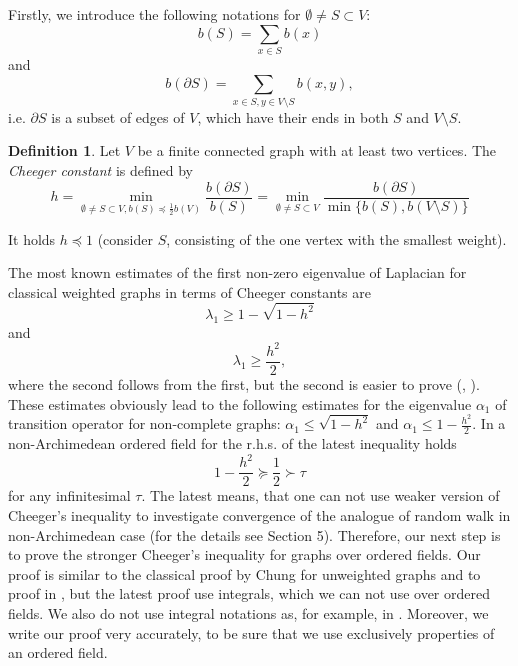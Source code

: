 \documentclass[a4paper,12pt]{amsart}
\theoremstyle{definition}
\newtheorem{definition}{Definition}
\newcommand{\weight}{b}
\begin{document}
Firstly, we introduce the following notations for $\emptyset\ne S\subset V$:
\begin{equation*}
\weight(S)=\sum_{x\in S}\weight (x)
\end{equation*}
and
\begin{equation*}
\weight(\partial S)=\sum_{x\in S,y\in V\setminus S}\weight (x,y),
\end{equation*}
i.e. $\partial S$ is a subset of edges of $V$, which have their ends in both $S$ and $V\setminus S$.
\begin{definition}
Let $V$ be a finite connected graph with at least two vertices. The \emph{Cheeger constant} is defined by
\begin{equation}\label{Def:Cheeger}
h = \min_{\emptyset\ne S\subset V, \weight(S)\preceq\frac{1}{2}\weight(V) }\dfrac{\weight(\partial S)}{\weight(S)}= \min_{\emptyset\ne S\subset V}\dfrac{\weight(\partial S)}{\min\{\weight(S),\weight(V\setminus S)\}}
\end{equation}
\end{definition}
It holds $h\preceq 1$ (consider $S$, consisting of the one vertex with the smallest weight).

The most known estimates of the first non-zero eigenvalue of Laplacian for classical weighted graphs in terms of Cheeger constants are 
\begin{equation*}
\lambda_1\ge 1-\sqrt{1-h^2}
\end{equation*}
and
\begin{equation*}
\lambda_1\ge \dfrac{h^2}{2},
\end{equation*}
where the second follows from the first, but the second is easier to prove (\cite{BauerJost}, \cite{Chung}).
These estimates obviously lead to the following estimates for the eigenvalue $\alpha_1$ of transition operator for non-complete graphs: $\alpha_1\le \sqrt{1-h^2}$  and $\alpha_1\le 1-\frac{h^2}{2}$. 
In a non-Archimedean ordered field for the r.h.s. of the latest inequality holds 
$$
1-\frac{h^2}{2}\succeq \frac{1}{2}\succ \tau
$$
for any infinitesimal $\tau$. The latest means, that one can not use weaker version of Cheeger's inequality to investigate convergence of the analogue of random walk in non-Archimedean case (for the details see Section 5). Therefore, our next step is to prove the stronger Cheeger's inequality for graphs over ordered fields. Our proof is similar to the classical proof by Chung \cite{Chung} for unweighted graphs and to proof in \cite{BauerJost}, but the latest proof use integrals, which we can not use over ordered fields. We also do not use integral notations as, for example, in \cite{Grigoryan}. Moreover, we write our proof very accurately, to be sure that we use exclusively properties of an ordered field.
\end{document}
